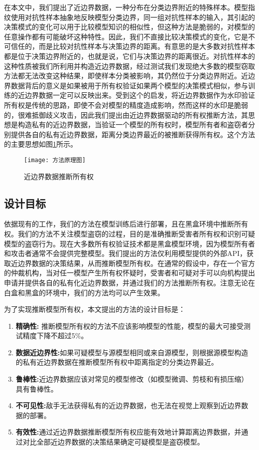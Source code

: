 在本文中，我们提出了近边界数据，一种分布在分类边界附近的特殊样本。模型指纹\cite{cao2021ipguard}使用对抗性样本抽象地反映模型分类边界，同一组对抗性样本的输入，其引起的决策模式的变化可以用于比较模型知识的相似性，但这种方法是脆弱的，对模型的任意操作都有可能破坏这种特性。因此，我们不直接比较决策模式的变化，它是不可信任的，而是比较对抗性样本与决策边界的距离。有意思的是大多数对抗性样本都是位于决策边界附近的，也就是说，它们与决策边界的距离很近。对抗性样本的这种性质被我们所利用并构造近边界数据，经过测试我们发现绝大多数的模型窃取方法都无法改变这种结果，即使样本分类被影响，其仍然位于分类边界附近。近边界数据背后的意义是如果被用于所有权验证如果两个模型的决策模式相似，参与训练的近边界数据一定可以反映出来。受到这个的启发，将近边界数据作为水印验证所有权是传统的思路，即使不会对模型的精度造成影响，然而这样的水印是脆弱的，很难抵御歧义攻击，因此我们提出由近边界数据驱动的所有权推断方法，其思想是构造私有的近边界数据，当验证一个模型的所有权时，模型所有者和盗窃者分别提供各自的私有近边界数据，距离分类边界最近的被推断获得所有权。这个方法的主要思想如图\ref{方法原理图}所示。
\begin{figure}[htbp]%
	\centering
	\texttt{[image: 方法原理图]}
	\setlength{\abovecaptionskip}{5mm} %
	\caption{近边界数据推断所有权}
	\label{方法原理图}
\end {figure}

\subsection{设计目标}

依据现有的工作，我们的方法在模型训练后进行部署，且在黑盒环境中推断所有权。我们的方法不关注模型盗窃的过程，目的是准确推断受害者所有权和识别可疑模型的盗窃行为。现在大多数所有权验证技术都是黑盒模型环境，因为模型所有者和攻击者通常不会提供完整模型。我们提出的方法仅利用模型提供的外部API，获取近边界数据的决策结果，从而推断模型所有权。在通常的假设中，存在一个官方的仲裁机构，当对任一模型产生所有权怀疑时，受害者和可疑对手可以向机构提出申请并提供各自的私有化近边界数据，并通过我们的方法推断所有权。注意无论在白盒和黑盒的环境中，我们的方法均可以产生效果。

为了实现推断模型所有权，本文提出的方法的设计目标是：
\begin{enumerate}
	\renewcommand{\labelenumi}{\theenumi)}
	\item \textbf{精确性:} 推断模型所有权的方法不应该影响模型的性能，模型的最大可接受测试精度下降不超过5\%。
	\item \textbf{数据近边界性:}如果可疑模型与源模型相同或来自源模型，则根据源模型构造的私有近边界数据在推断模型所有权中距离指定的分类边界最近。
	\item \textbf{鲁棒性:}近边界数据应该对常见的模型修改（如模型微调、剪枝和有损压缩）具有鲁棒性。
	\item \textbf{不可见性:}敌手无法获得私有的近边界数据，也无法在视觉上观察到近边界数据的部署。
	\item \textbf{有效性:}通过近边界数据推断模型所有权应能有效地计算距离边界数据，并通过对比全部近边界数据的决策结果确定可疑模型是盗窃模型。
\end{enumerate}

